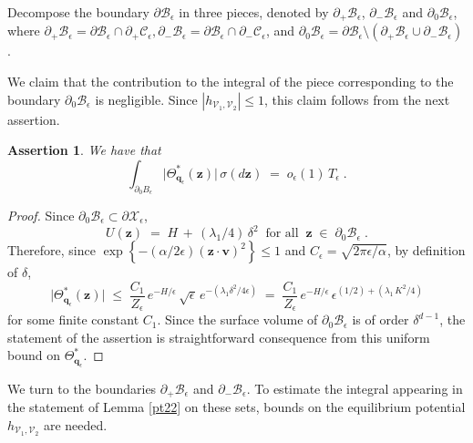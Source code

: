 \documentclass[reqno]{amsart}
\newcounter{as}[section]
\newtheorem{asser}[as]{Assertion}
\newcommand{\mc}[1]{{\mathcal #1}}
\newcommand{\bs}[1]{{\boldsymbol #1}}
\newcommand{\<}{\langle}
\renewcommand{\>}{\rangle}
\begin{document}
Decompose the boundary $\partial\mc{B}_{\epsilon}$ in three pieces,
denoted by $\partial_{+}\mc{B}_{\epsilon}$, $\partial_{-}
\mc{B}_{\epsilon}$ and $\partial_{0} \mc{B}_{\epsilon}$, where
$\partial_{+}\mc{B}_{\epsilon} = \partial\mc{B}_{\epsilon}
\cap \partial_{+} \mc{C}_{\epsilon}, \partial_{-}
\mc{B}_{\epsilon}= \partial \mc{B}_{\epsilon}
\cap\partial_{-}\mc{C}_{\epsilon}$, and $\partial_{0}
\mc{B}_{\epsilon} =\partial \mc{B}_{\epsilon} \setminus(\partial_{+}
\mc{B}_{\epsilon} \cup\partial_{-} \mc{B}_{\epsilon})$.

We claim that the contribution to the integral of the piece
corresponding to the boundary $\partial_{0}\mc{B}_{\epsilon}$ is
negligible. Since $|h_{\mc{V}_{1},\mc{V}_{2}}|\le 1$, this claim
follows from the next assertion.

\begin{asser}
\label{bs1}
We have that
\begin{equation*}
\int_{\partial_{0}B_{\epsilon}}
\big| \Theta_{\bs{q}_{\epsilon}}^{*} (\bs{z})\big|
\, \sigma(d\bs{z})\;=\;o_{\epsilon}(1)\,T_{\epsilon}\;.
\end{equation*}
\end{asser}

\begin{proof}
Since $\partial_{0}\mc{B}_{\epsilon}\subset\partial\mc{X}_{\epsilon}$,
\begin{equation}
U(\bs{z})\;=\;H \,+\,
(\lambda_{1}/4)\, \delta^{2}\;\;\mbox{for all}
\;\;\bs{z}\;\in\;\partial_{0}\mc{B}_{\epsilon}\;.
\end{equation}
Therefore, since $\exp\left\{ - (\alpha/2\epsilon)
  (\bs{z}\cdot\bs{v})^{2}\right\} \le 1$ and $C_\epsilon =
\sqrt{2\pi\epsilon/\alpha}$,  by definition of $\delta$,
\begin{equation*}
\big|\Theta^*_{\bs{q}_{\epsilon}}(\bs{z})\big| \;\le\;
\frac {C_1}{Z_{\epsilon}}\, e^{-H/\epsilon}\, \sqrt{\epsilon}
\, e^{-(\lambda_{1}\delta^{2}/4\epsilon)}
\;=\; \frac {C_1}{Z_{\epsilon}}\,  e^{-H/\epsilon}\,
\epsilon^{(1/2)+(\lambda_{1}\, K^{2}/4)}
\end{equation*}
for some finite constant $C_1$. Since the surface volume of
$\partial_{0}\mc{B}_{\epsilon}$ is of order $\delta^{d-1}$, the
statement of the assertion is straightforward consequence from this
uniform bound on $\Theta^*_{\bs{q}_{\epsilon}}$.
\end{proof}

We turn to the boundaries $\partial_{+}\mc{B}_{\epsilon}$ and
$\partial_{-}\mc{B}_{\epsilon}$. To estimate the integral appearing in
the statement of Lemma \ref{pt22} on these sets, bounds on the
equilibrium potential $h_{\mc{V}_{1},\mc{V}_{2}}$ are needed.
\end{document}
